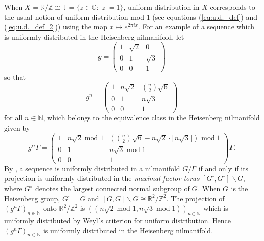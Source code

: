 \documentclass[12pt]{article}
\theoremstyle{plain} %
\theoremstyle{definition} %
\theoremstyle{plain}
\theoremstyle{plain}
\numberwithin{equation}{section}
\newcommand{\N}{\mathbb{N}}
\newcommand{\Z}{\mathbb{Z}}
\newcommand{\R}{\mathbb{R}}
\newcommand{\C}{\mathbb{C}}
\newcommand{\T}{\mathbb{T}}
\newcommand{\1}{\mathbbm{1}}
\newcommand{\floor}[1]{\lfloor #1 \rfloor}
\renewcommand{\mod}{\operatorname{mod}}
\begin{document}
When $X= \R/\Z\cong \T=\{z\in \C:|z|=1\}$, uniform distribution in $X$ corresponds to the usual notion of uniform distribution mod 1 (see equations (\ref{eq:u.d._def}) and (\ref{eq:u.d._def_2})) using the map $x\mapsto e^{2\pi i x}$. For an example of a sequence which is uniformly distributed in the Heisenberg nilmanifold, let 
\begin{equation*}
    g = \begin{pmatrix}
            1 & \sqrt{2} & 0\\
            0 & 1 & \sqrt{3}\\
            0 & 0 & 1
        \end{pmatrix}
\end{equation*}
so that 
\begin{equation*}
    g^n = \begin{pmatrix}
            1 & n\sqrt{2} & \binom{n}{2}\sqrt{6}\\
            0 & 1 & n\sqrt{3}\\
            0 & 0 & 1
        \end{pmatrix}
\end{equation*}
for all $n\in \N$, which belongs to the equivalence class in the Heisenberg nilmanifold given by 
\begin{equation*}
    g^n\Gamma = \begin{pmatrix}
            1 & n\sqrt{2} \mod1 & \left(\binom{n}{2}\sqrt{6}-n\sqrt{2}\cdot \floor{n\sqrt{3}}\right)\mod 1\\
            0 & 1 & n\sqrt{3}\mod 1\\
            0 & 0 & 1
        \end{pmatrix}\Gamma.
\end{equation*}
By \cite[Theorem C]{Leibman04}, a sequence is uniformly distributed in a nilmanifold $G/\Gamma$ if and only if its projection is uniformly distributed in the \emph{maximal factor torus} $[G^{\circ},G^{\circ}]\backslash G$, where $G^{\circ}$ denotes the largest connected normal subgroup of $G$. When $G$ is the Heisenberg group, $G^{\circ} = G$ and $[G,G]\backslash G\cong \R^2/\Z^2$. The projection of $(g^n\Gamma)_{n\in \N}$ onto $\R^2/\Z^2$ is $((n\sqrt{2}\mod 1, n\sqrt{3}\mod 1))_{n\in \N}$ which is uniformly distributed by Weyl's criterion for uniform distribution. Hence $(g^n\Gamma)_{n\in \N}$ is uniformly distributed in the Heisenberg nilmanifold.
\end{document}

